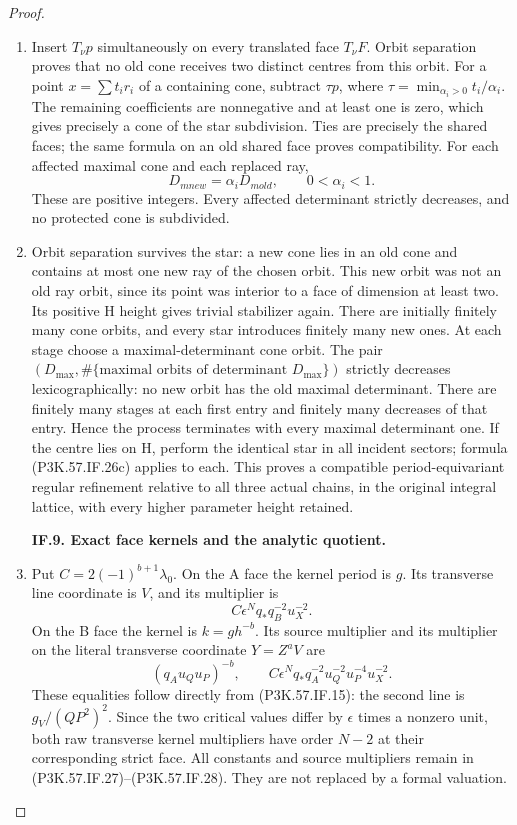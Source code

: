\begin{proof}
\begin{enumerate}[label=\arabic*.]
\item Insert \(T_\nu p\) simultaneously on every translated
face \(T_\nu F\). Orbit separation proves that no old
cone receives two distinct centres from this orbit.
For a point \(x=\sum t_i r_i\) of a containing cone,
subtract \(\tau p\), where
\(\tau=\min_{\alpha_i>0}t_i/\alpha_i\). The remaining
coefficients are nonnegative and at least one is zero,
which gives precisely a cone of the star subdivision.
Ties are precisely the shared faces; the same formula
on an old shared face proves compatibility. For each
affected maximal cone and each replaced ray,
\[
                        D_{
m new}=\alpha_i D_{
m old},
                 \qquad 0<\alpha_i<1.                  \tag{P3K.57.IF.26c}
\]
These are positive integers. Every affected determinant
strictly decreases, and no protected cone is subdivided.

\item Orbit separation survives the star: a new cone lies in
an old cone and contains at most one new ray of the chosen
orbit. This new orbit was not an old ray orbit, since its
point was interior to a face of dimension at least two.
Its positive H height gives trivial stabilizer again.
There are initially finitely many cone orbits, and every
star introduces finitely many new ones. At each stage
choose a maximal-determinant cone orbit. The pair
\((D_{\max},\#\{\text{maximal orbits of determinant }D_{\max}\})\)
strictly decreases lexicographically: no new orbit has
the old maximal determinant. There are finitely many
stages at each first entry and finitely many decreases
of that entry. Hence the process terminates with every
maximal determinant one. If the centre lies on H, perform
the identical star in all incident sectors; formula
(P3K.57.IF.26c) applies to each. This proves a compatible
period-equivariant regular refinement relative to all
three actual chains, in the original integral lattice,
with every higher parameter height retained.

\par\medskip\noindent\textbf{IF.9. Exact face kernels and the analytic quotient.}\par\nopagebreak[4]

\item Put \(C=2(-1)^{b+1}\lambda_0\). On the A face the kernel period is
\(g\). Its transverse line coordinate is \(V\), and its multiplier is
\[
                  C\epsilon^N q_*q_B^{-2}u_X^{-2}.       \tag{P3K.57.IF.27}
\]
On the B face the kernel is \(k=g h^{-b}\). Its source multiplier
and its multiplier on the literal transverse coordinate \(Y=Z^aV\)
are
\[
 (q_Au_Qu_P)^{-b},\qquad
          C\epsilon^N q_*q_A^{-2}u_Q^{-2}u_P^{-4}u_X^{-2}.       \tag{P3K.57.IF.28}
\]
These equalities follow directly from (P3K.57.IF.15): the second line is
\(g_V/(QP^2)^2\). Since the two critical values differ by
\(\epsilon\) times a nonzero unit, both raw transverse kernel
multipliers have order \(N-2\) at their corresponding strict face.
All constants and source multipliers remain in (P3K.57.IF.27)--\allowbreak (P3K.57.IF.28).
They are not replaced by a formal valuation.


\end{enumerate}
\end{proof}
